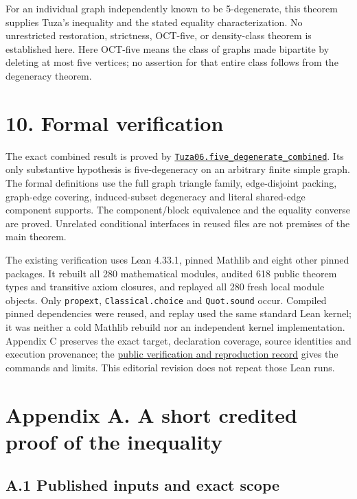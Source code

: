\documentclass[11pt]{article}
\begin{document}
For an individual graph independently known to be 5-degenerate, this
theorem supplies Tuza's inequality and the stated equality
characterization. No unrestricted restoration, strictness, OCT-five, or
density-class theorem is established here. Here OCT-five means the class
of graphs made bipartite by deleting at most five vertices; no assertion
for that entire class follows from the degeneracy theorem.

\section{10. Formal verification}\label{formal-verification}

The exact combined result is proved by
\href{https://github.com/pappa211/ai-math-experiments/blob/main/problems/TUZA-06/lean/Tuza06/FiveDegenerate.lean}{\texttt{Tuza06.five\_degenerate\_combined}}.
Its only substantive hypothesis is five-degeneracy on an arbitrary
finite simple graph. The formal definitions use the full graph triangle
family, edge-disjoint packing, graph-edge covering, induced-subset
degeneracy and literal shared-edge component supports. The
component/block equivalence and the equality converse are proved.
Unrelated conditional interfaces in reused files are not premises of the
main theorem.

The existing verification uses Lean 4.33.1, pinned Mathlib and eight
other pinned packages. It rebuilt all 280 mathematical modules, audited
618 public theorem types and transitive axiom closures, and replayed all
280 fresh local module objects. Only \texttt{propext},
\texttt{Classical.choice} and \texttt{Quot.sound} occur. Compiled pinned
dependencies were reused, and replay used the same standard Lean kernel;
it was neither a cold Mathlib rebuild nor an independent kernel
implementation. Appendix C preserves the exact target, declaration
coverage, source identities and execution provenance; the
\href{https://github.com/pappa211/ai-math-experiments/blob/main/problems/TUZA-06/REPRODUCTION.md}{public verification and
reproduction record} gives the commands and limits. This editorial
revision does not repeat those Lean runs.

\section{Appendix A. A short credited proof of the
inequality}\label{appendix-a.-a-short-credited-proof-of-the-inequality}

\subsection{A.1 Published inputs and exact
scope}\label{a.1-published-inputs-and-exact-scope}
\end{document}
